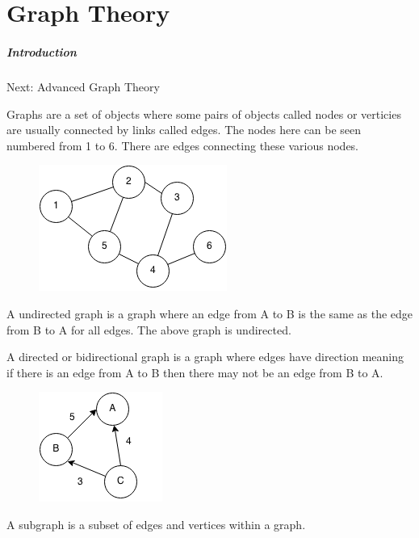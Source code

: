 \documentclass[11pt,oneside]{book}
\makeatletter
\def\maxwidth#1{\ifdim\Gin@nat@width>#1 #1\else\Gin@nat@width\fi}
\makeatother
\begin{document}
\part{ Graph Theory }
    \subsubsection{ Introduction }
    

Next: Advanced Graph Theory

Graphs are a set of objects where some pairs of objects  called nodes or verticies are usually connected by links called edges. The nodes here can be seen numbered from 1 to 6. There are edges connecting these various nodes.

\vspace{5px}\begin{figure}[H]\centering
        \includegraphics[width=0.66\maxwidth{\textwidth}]{graph.png}
        \end{figure}

A undirected graph is a graph where an edge from A to B is the same as the edge from B to A for all edges. The above graph is undirected.

A directed or bidirectional graph is a graph where edges have direction meaning if there is an edge from A to B then there may not be an edge from B to A.

\vspace{5px}\begin{figure}[H]\centering
        \includegraphics[width=0.66\maxwidth{\textwidth}]{digraph.png}
        \end{figure}

A subgraph is a subset of edges and vertices within a graph.
\end{document}
